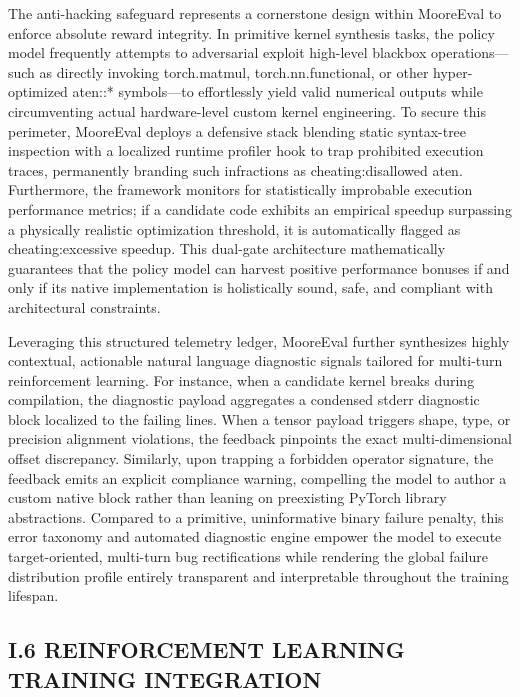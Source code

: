 \documentclass[
  10
]{article}
\begin{document}
The anti-hacking safeguard represents a cornerstone design within
MooreEval to enforce absolute reward integrity. In primitive kernel
synthesis tasks, the policy model frequently attempts to adversarial
exploit high-level blackbox operations---such as directly invoking
torch.matmul, torch.nn.functional, or other hyper-optimized aten::*
symbols---to effortlessly yield valid numerical outputs while
circumventing actual hardware-level custom kernel engineering. To secure
this perimeter, MooreEval deploys a defensive stack blending static
syntax-tree inspection with a localized runtime profiler hook to trap
prohibited execution traces, permanently branding such infractions as
cheating:disallowed aten. Furthermore, the framework monitors for
statistically improbable execution performance metrics; if a candidate
code exhibits an empirical speedup surpassing a physically realistic
optimization threshold, it is automatically flagged as
cheating:excessive speedup. This dual-gate architecture mathematically
guarantees that the policy model can harvest positive performance
bonuses if and only if its native implementation is holistically sound,
safe, and compliant with architectural constraints.

Leveraging this structured telemetry ledger, MooreEval further
synthesizes highly contextual, actionable natural language diagnostic
signals tailored for multi-turn reinforcement learning. For instance,
when a candidate kernel breaks during compilation, the diagnostic
payload aggregates a condensed stderr diagnostic block localized to the
failing lines. When a tensor payload triggers shape, type, or precision
alignment violations, the feedback pinpoints the exact multi-dimensional
offset discrepancy. Similarly, upon trapping a forbidden operator
signature, the feedback emits an explicit compliance warning, compelling
the model to author a custom native block rather than leaning on
preexisting PyTorch library abstractions. Compared to a primitive,
uninformative binary failure penalty, this error taxonomy and automated
diagnostic engine empower the model to execute target-oriented,
multi-turn bug rectifications while rendering the global failure
distribution profile entirely transparent and interpretable throughout
the training lifespan.

\subsection{I.6 REINFORCEMENT LEARNING TRAINING
INTEGRATION}\label{i.6-reinforcement-learning-training-integration}
\end{document}
